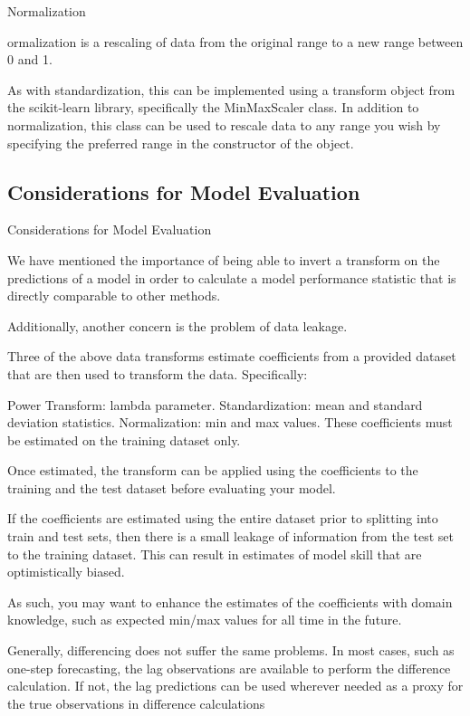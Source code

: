 {Normalization

ormalization is a rescaling of data from the original range to a new range between 0 and 1.

As with standardization, this can be implemented using a transform object from the scikit-learn library, specifically the MinMaxScaler class. In addition to normalization, this class can be used to rescale data to any range you wish by specifying the preferred range in the constructor of the object.



\subsection{Considerations for Model Evaluation}

Considerations for Model Evaluation

We have mentioned the importance of being able to invert a transform on the predictions of a model in order to calculate a model performance statistic that is directly comparable to other methods.

Additionally, another concern is the problem of data leakage.

Three of the above data transforms estimate coefficients from a provided dataset that are then used to transform the data. Specifically:

Power Transform: lambda parameter.
Standardization: mean and standard deviation statistics.
Normalization: min and max values.
These coefficients must be estimated on the training dataset only.

Once estimated, the transform can be applied using the coefficients to the training and the test dataset before evaluating your model.

If the coefficients are estimated using the entire dataset prior to splitting into train and test sets, then there is a small leakage of information from the test set to the training dataset. This can result in estimates of model skill that are optimistically biased.

As such, you may want to enhance the estimates of the coefficients with domain knowledge, such as expected min/max values for all time in the future.

Generally, differencing does not suffer the same problems. In most cases, such as one-step forecasting, the lag observations are available to perform the difference calculation. If not, the lag predictions can be used wherever needed as a proxy for the true observations in difference calculations

}
